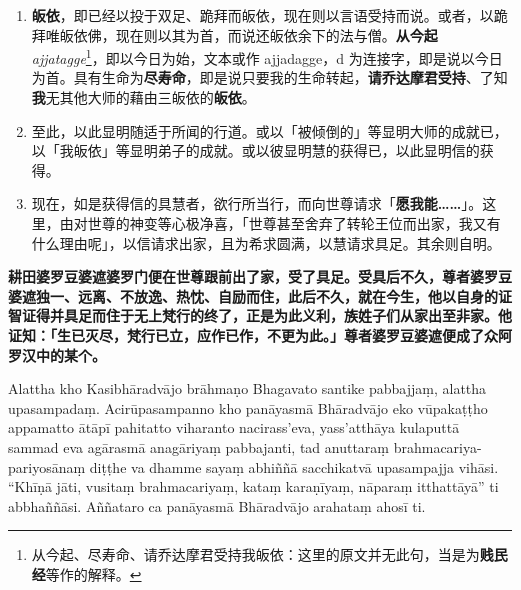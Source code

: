 \begin{enumerate}
\item \textbf{皈依}，即已经以投于双足、跪拜而皈依，现在则以言语受持而说。或者，以跪拜唯皈依佛，现在则以其为首，而说还皈依余下的法与僧。\textbf{从今起} \textit{ajjatagge}\footnote{从今起、尽寿命、请乔达摩君受持我皈依：这里的原文并无此句，当是为\textbf{贱民经}等作的解释。}，即以今日为始，文本或作 ajjadagge，d 为连接字，即是说以今日为首。具有生命为\textbf{尽寿命}，即是说只要我的生命转起，\textbf{请乔达摩君受持}、了知\textbf{我}无其他大师的藉由三皈依的\textbf{皈依}。
\item 至此，以此显明随适于所闻的行道。或以「被倾倒的」等显明大师的成就已，以「我皈依」等显明弟子的成就。或以彼显明慧的获得已，以此显明信的获得。
\item 现在，如是获得信的具慧者，欲行所当行，而向世尊请求「\textbf{愿我能……}」。这里，由对世尊的神变等心极净喜，「世尊甚至舍弃了转轮王位而出家，我又有什么理由呢」，以信请求出家，且为希求圆满，以慧请求具足。其余则自明。\end{enumerate}

\textbf{耕田婆罗豆婆遮婆罗门便在世尊跟前出了家，受了具足。受具后不久，尊者婆罗豆婆遮独一、远离、不放逸、热忱、自励而住，此后不久，就在今生，他以自身的证智证得并具足而住于无上梵行的终了，正是为此义利，族姓子们从家出至非家。他证知：「生已灭尽，梵行已立，应作已作，不更为此。」尊者婆罗豆婆遮便成了众阿罗汉中的某个。}

Alattha kho Kasibhāradvājo brāhmaṇo Bhagavato santike pabbajjaṃ, alattha upasampadaṃ. Acirūpasampanno kho panāyasmā Bhāradvājo eko vūpakaṭṭho appamatto ātāpī pahitatto viharanto nacirass’eva, yass’atthāya kulaputtā sammad eva agārasmā anagāriyaṃ pabbajanti, tad anuttaraṃ brahmacariya-pariyosānaṃ diṭṭhe va dhamme sayaṃ abhiññā sacchikatvā upasampajja vihāsi. “Khīṇā jāti, vusitaṃ brahmacariyaṃ, kataṃ karaṇīyaṃ, nāparaṃ itthattāyā” ti abbhaññāsi. Aññataro ca panāyasmā Bhāradvājo arahataṃ ahosī ti.

